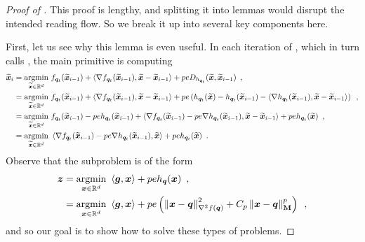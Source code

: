 \begin{proof}[Proof of ]
This proof is lengthy, and splitting it into lemmas would disrupt the intended reading flow. So we break it up into several key components here.

 First, let us see why this lemma is even useful. In each iteration of , which in turn calls , the main primitive is computing
\begin{align*}
    \xtilde_i &= \argmin{\xtilde \in \R^d} f_{\vq_t}(\xtilde_{i-1}) + \ip{\nabla f_{\vq_t}(\xtilde_{i-1}), \xtilde-\xtilde_{i-1}} + peD_{h_{\vq_t}}(\xtilde,\xtilde_{i-1})\enspace, \\
    &= \argmin{\xtilde \in \R^d} f_{\vq_t}(\xtilde_{i-1}) + \ip{\nabla f_{\vq_t}(\xtilde_{i-1}), \xtilde-\xtilde_{i-1}} + pe \left(h_{\vq_t}(\xtilde) - h_{\vq_t}(\xtilde_{i-1}) - \ip{\nabla h_{\vq_t}(\xtilde_{i-1}), \xtilde - \xtilde_{i-1}}\right)\enspace, \\
    &= \argmin{\xtilde \in \R^d} f_{\vq_t}(\xtilde_{i-1})-peh_{\vq_t}(\xtilde_{i-1}) + \ip{\nabla f_{\vq_t}(
    \xtilde_{i-1})-pe\nabla h_{\vq_t}(\xtilde_{i-1}), \xtilde-\xtilde_{i-1}} + peh_{\vq_t}(\xtilde)\enspace, \\
    &= \argmin{\xtilde\in\R^d} \ip{\nabla f_{\vq_t}(
    \xtilde_{i-1})-pe\nabla h_{\vq_t}(\xtilde_{i-1}), \xtilde} + peh_{\vq_t}(\xtilde)\enspace.
\end{align*}
Observe that the subproblem is of the form
\begin{align}
    \vz &= \argmin{\vx\in\R^d} \ip{\vg, \vx} + peh_{\vq}(\vx)\enspace,\nonumber\\
    &= \argmin{\vx\in\R^d} \ip{\vg,\vx}+pe\inparen{\norm{\vx-\vq}_{\nabla^2 f(\vq)}^2 + C_p\norm{\vx-\vq}_{\mM}^p}\enspace,\label{eq:equiv_prox_problem}
\end{align}
and so our goal is to show how to solve these types of problems.


\end{proof}
